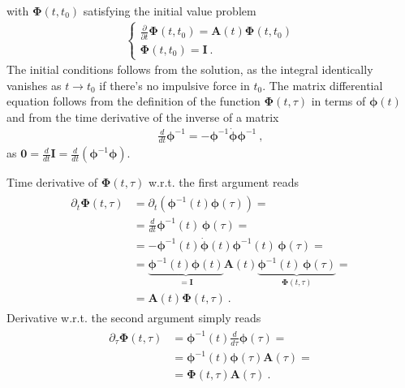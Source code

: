 \documentclass[letterpaper,10pt,english]{jupyterBook}
\begin{document}
\sphinxAtStartPar
with \(\boldsymbol\Phi(t,t_0)\) satisfying the initial value problem
\begin{equation*}
\begin{split}\begin{cases}
  \frac{\partial}{\partial t} \boldsymbol\Phi(t,t_0) = \mathbf{A}(t) \boldsymbol\Phi(t,t_0) \\
  \boldsymbol\Phi(t,t_0) = \mathbf{I} \ .
\end{cases}\end{split}
\end{equation*}
\sphinxAtStartPar
The initial conditions follows from the solution, as the integral identically vanishes as \(t \rightarrow t_0\) if there’s no impulsive force in \(t_0\). The matrix differential equation follows from the definition of the function \(\boldsymbol\Phi(t,\tau)\) in terms of \(\boldsymbol\phi(t)\) and from the time derivative of the inverse of a matrix
\begin{equation*}
\begin{split}\frac{d}{dt} \boldsymbol\phi^{-1} = - \boldsymbol\phi^{-1} \dot{\boldsymbol\phi} \boldsymbol\phi^{-1} \ ,\end{split}
\end{equation*}
\sphinxAtStartPar
as \(\mathbf{0} = \frac{d}{dt} \mathbf{I} = \frac{d}{dt} \left( \boldsymbol\phi^{-1} \boldsymbol\phi \right)\).

\sphinxAtStartPar
Time derivative of \(\boldsymbol\Phi(t,\tau)\) w.r.t. the first argument reads
\begin{equation*}
\begin{split}\begin{aligned}
  \partial_t \boldsymbol\Phi(t,\tau) 
  & = \partial_t \left( \boldsymbol\phi^{-1}(t) \boldsymbol\phi(\tau) \right) = \\
  & = \frac{d}{dt} \boldsymbol\phi^{-1}(t) \, \boldsymbol\phi(\tau) = \\
  & = - \boldsymbol\phi^{-1}(t) \dot{\boldsymbol\phi}(t) \boldsymbol\phi^{-1}(t) \, \boldsymbol\phi(\tau) = \\
  & =   \underbrace{\boldsymbol\phi^{-1}(t) \boldsymbol\phi(t)}_{=\mathbf{I}} \mathbf{A}(t) \underbrace{\boldsymbol\phi^{-1}(t)  \, \boldsymbol\phi(\tau)}_{\boldsymbol\Phi(t,\tau)} = \\
  & = \mathbf{A}(t) \boldsymbol\Phi(t, \tau) \ .
\end{aligned}\end{split}
\end{equation*}
\sphinxAtStartPar
Derivative w.r.t. the second argument simply reads
\begin{equation*}
\begin{split}\begin{aligned}
  \partial_{\tau} \boldsymbol\Phi(t,\tau) 
  & = \boldsymbol\phi^{-1}(t) \frac{d}{d\tau} \boldsymbol\phi(\tau) = \\
  & = \boldsymbol\phi^{-1}(t) \boldsymbol\phi(\tau) \mathbf{A}(\tau) = \\
  & = \boldsymbol\Phi(t,\tau) \mathbf{A}(\tau) \ .
\end{aligned}\end{split}
\end{equation*}
\end{document}
